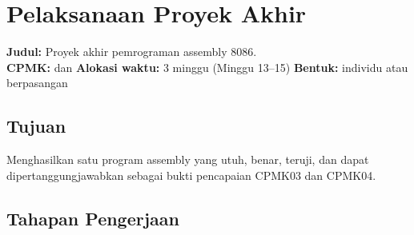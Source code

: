 \section{Pelaksanaan Proyek Akhir}
\label{sec:praktikum-bab17}

\begin{praktikumbox}
\vspace{1.1em}
\textbf{Judul:} Proyek akhir pemrograman assembly 8086.\\[0.3em]
\textbf{CPMK:}  dan  \quad\textbullet\quad
\textbf{Alokasi waktu:} 3 minggu (Minggu 13--15) \quad\textbullet\quad
\textbf{Bentuk:} individu atau berpasangan
\end{praktikumbox}

\subsection{Tujuan}

Menghasilkan satu program assembly yang utuh, benar, teruji, dan
dapat dipertanggungjawabkan sebagai bukti pencapaian CPMK03 dan
CPMK04.

\subsection{Tahapan Pengerjaan}

